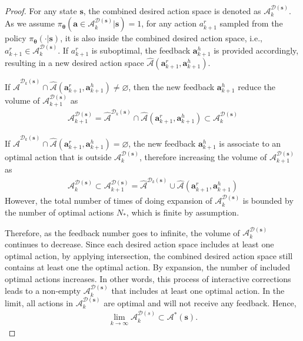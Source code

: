 \begin{proof}
    For any state $\bm s$, the combined desired action space is denoted as $\mathcal{A}^{\mathcal{D}(\bm s)}_k$.
    As we assume $\pi_{\bm \theta}(\bm a \in \mathcal{A}^{\mathcal{D}(\bm s)}_k| \bm{s}) = 1$,
    for any action $a^r_{k+1}$ sampled from the policy $ \pi_{\bm \theta}(\cdot | \bm s)$, it is also inside the combined desired action space, i.e., $a^r_{k+1} \in \mathcal{A}^{\mathcal{D}(\bm s)}_k$. If $a^r_{k+1} $ is suboptimal, the feedback $\bm a^h_{k+1}$ is provided accordingly, resulting in a new desired action space  $\hat{\mathcal{A}}(\bm a^r_{k+1}, \bm a^h_{k+1}) $.

    If  $\hat{ \mathcal{A}}^{\mathcal{D}_{k}(\bm s)} \cap \hat{\mathcal{A}}(\bm a^r_{k+1}, \bm a^h_{k+1}) \! \neq \! \varnothing$, then
    the new feedback $\bm a^h_{k+1}$ reduce the volume of $\mathcal{A}^{\mathcal{D}(\bm s)}_{k+1}$ as
    \begin{align}
        \mathcal{A}^{\mathcal{D}(\bm s)}_{k+1} = \hat{ \mathcal{A}}^{\mathcal{D}_{k}(\bm s)} \cap \hat{\mathcal{A}}(\bm a^r_{k+1}, \bm a^h_{k+1}) \subset \mathcal{A}^{\mathcal{D}(\bm s)}_{k}
    \end{align}

    If $\hat{ \mathcal{A}}^{\mathcal{D}_{k}(\bm s)} \cap \hat{\mathcal{A}}(\bm a^r_{k+1}, \bm a^h_{k+1}) = \varnothing$, the new feedback $\bm a^h_{k+1}$ is associate to an optimal action that is outside $\mathcal{A}^{\mathcal{D}(\bm s)}_{k}$, therefore increasing the volume of $\mathcal{A}^{\mathcal{D}(\bm s)}_{k+1}$ as 
    \begin{align}
        \mathcal{A}^{\mathcal{D}(\bm s)}_{k} \subset \mathcal{A}^{\mathcal{D}(\bm s)}_{k+1} = \hat{ \mathcal{A}}^{\mathcal{D}_{k}(\bm s)} \cup \hat{\mathcal{A}}(\bm a^r_{k+1}, \bm a^h_{k+1}) 
    \end{align}    
    However, the total number of times of doing expansion of $\mathcal{A}^{\mathcal{D}(\bm s)}_{k}$ is bounded by the number of optimal actions $N_*$, which is finite by assumption.

    Therefore, as the feedback number goes to infinite, the volume of $\mathcal{A}^{\mathcal{D}(\bm s)}_{k}$ continues to decrease. 
    Since each desired action space includes at least one optimal action, by applying intersection, the combined desired action space still contains at least one the optimal action. By expansion, the number of included optimal actions increases. 
    In other words, this process of interactive corrections leads to a non-empty $\mathcal{A}^{\mathcal{D}(\bm s)}_{k}$ that includes at least one optimal action.
    In the limit, all actions in $\mathcal{A}^{\mathcal{D}(\bm s)}_{k}$ are optimal and will not receive any feedback. Hence,
    \begin{align*}
        \lim_{k\rightarrow \infty} \mathcal{A}^{\mathcal{D}(s)}_k  \subset \mathcal{A}^*(\bm s).
    \end{align*}
    

\end{proof}
